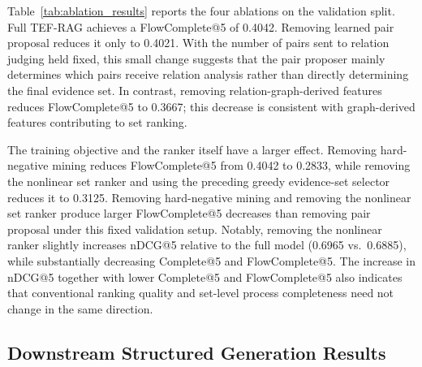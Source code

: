Table~\ref{tab:ablation_results} reports the four ablations on the validation split. Full TEF-RAG achieves a FlowComplete@5 of 0.4042. Removing learned pair proposal reduces it only to 0.4021. With the number of pairs sent to relation judging held fixed, this small change suggests that the pair proposer mainly determines which pairs receive relation analysis rather than directly determining the final evidence set. In contrast, removing relation-graph-derived features reduces FlowComplete@5 to 0.3667; this decrease is consistent with graph-derived features contributing to set ranking.

The training objective and the ranker itself have a larger effect. Removing hard-negative mining reduces FlowComplete@5 from 0.4042 to 0.2833, while removing the nonlinear set ranker and using the preceding greedy evidence-set selector reduces it to 0.3125. Removing hard-negative mining and removing the nonlinear set ranker produce larger FlowComplete@5 decreases than removing pair proposal under this fixed validation setup. Notably, removing the nonlinear ranker slightly increases nDCG@5 relative to the full model (0.6965 vs.\ 0.6885), while substantially decreasing Complete@5 and FlowComplete@5. The increase in nDCG@5 together with lower Complete@5 and FlowComplete@5 also indicates that conventional ranking quality and set-level process completeness need not change in the same direction.

\begin{table}[t]
\caption{TEF-RAG ablation results on the validation split.}
\label{tab:ablation_results}
\centering
\small
\setlength{\tabcolsep}{3pt}
\end{table}

\subsection{Downstream Structured Generation Results}
\label{sec:generation_results}

